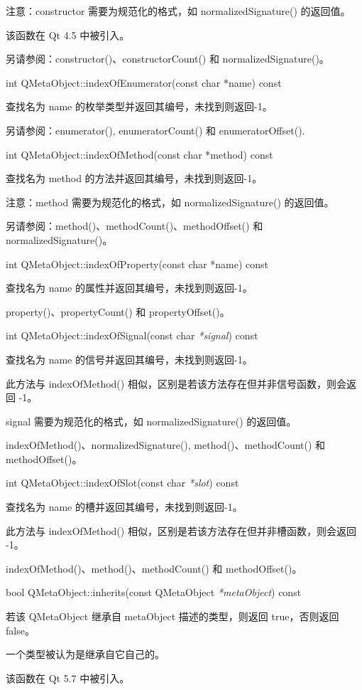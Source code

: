 注意：constructor 需要为规范化的格式，如 normalizedSignature() 的返回值。

该函数在 Qt 4.5 中被引入。

另请参阅：constructor()、constructorCount() 和 normalizedSignature()。

int QMetaObject::indexOfEnumerator(const char *name) const

查找名为 name 的枚举类型并返回其编号，未找到则返回-1。

另请参阅：enumerator(), enumeratorCount() 和 enumeratorOffset().

int QMetaObject::indexOfMethod(const char *method) const

查找名为 method 的方法并返回其编号，未找到则返回-1。

注意：method 需要为规范化的格式，如 normalizedSignature() 的返回值。

另请参阅：method()、methodCount()、methodOffset() 和 normalizedSignature()。

int QMetaObject::indexOfProperty(const char *name) const

查找名为 name 的属性并返回其编号，未找到则返回-1。

\begin{notice}[另请参阅]
property()、propertyCount() 和 propertyOffset()。	
\end{notice}

int QMetaObject::indexOfSignal(const char \emph{*signal}) const

查找名为 name 的信号并返回其编号，未找到则返回-1。

此方法与 indexOfMethod() 相似，区别是若该方法存在但并非信号函数，则会返回 -1。

\begin{notice}
signal 需要为规范化的格式，如 normalizedSignature() 的返回值。	
\end{notice}

\begin{notice}[另请参阅]
indexOfMethod()、normalizedSignature(), method()、methodCount() 和 methodOffset()。
\end{notice}

int QMetaObject::indexOfSlot(const char \emph{*slot}) const

查找名为 name 的槽并返回其编号，未找到则返回-1。

此方法与 indexOfMethod() 相似，区别是若该方法存在但并非槽函数，则会返回 -1。

\begin{notice}[另请参阅]
indexOfMethod()、method()、methodCount() 和 methodOffset()。
\end{notice}


bool QMetaObject::inherits(const QMetaObject \emph{*metaObject}) const

若该 QMetaObject 继承自 metaObject 描述的类型，则返回 true，否则返回 false。

一个类型被认为是继承自它自己的。

该函数在 Qt 5.7 中被引入。